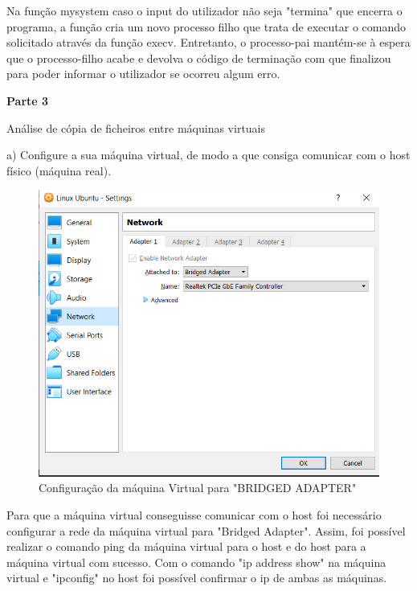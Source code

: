 \documentclass{article}
\begin{document}
	\vspace{4 em}
	
	Na função mysystem caso o input do utilizador não seja "termina" que encerra o programa,
	a função cria um novo processo filho que trata de executar o comando solicitado através da função execv. Entretanto, o processo-pai mantém-se à espera que o processo-filho acabe
	e devolva o código de terminação com que finalizou para poder informar o utilizador se ocorreu algum erro.

	\newpage
	
	\centerline{\textbf{Parte 3}}
	\vspace{1 em}
	\centerline{Análise de cópia de ficheiros entre máquinas virtuais}
	\vspace{3 em}
	
	
	a) Configure a sua máquina virtual, de modo a que consiga comunicar com o host
	físico (máquina real).
	\vspace{2 em}
	\begin{figure}[!htb]
		\centering
		\includegraphics[scale=0.7]{tp_sosd_a1}
		\caption{Configuração da máquina Virtual para "BRIDGED ADAPTER"}
	\end{figure}
	
	\vspace*{2 em}
	Para que a máquina virtual conseguisse comunicar com o host foi necessário configurar a rede da máquina virtual para "Bridged Adapter".
	Assim, foi possível realizar o comando ping da máquina virtual para o host e do host para a máquina virtual com sucesso.
	Com o comando "ip address show" na máquina virtual e "ipconfig" no host foi possível confirmar o ip de ambas as máquinas.
	
\end{document}
